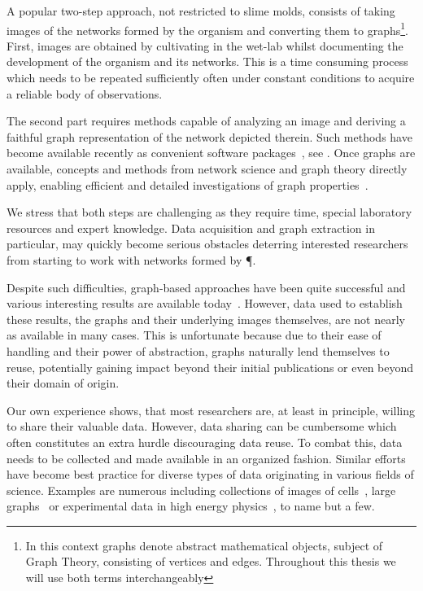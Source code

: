  	A popular two-step approach, not restricted to slime molds, consists of taking images of the networks formed by the organism and converting them to graphs\footnote{In this context graphs denote abstract mathematical objects, subject of Graph Theory, consisting of vertices and edges. Throughout this thesis we will use both terms interchangeably}. First, images are obtained by cultivating \Pp in the wet-lab whilst documenting the development of the organism and its networks. This is a time consuming process which needs to be repeated sufficiently often under constant conditions to acquire a reliable body of observations. 

 	The second part requires methods capable of analyzing an image and deriving a faithful graph representation of the network depicted therein. Such methods have become available recently as convenient software packages~\cite{dirnberger2015nefi}, see . Once graphs are available, concepts and methods from network science and graph theory directly apply, enabling efficient and detailed investigations of graph properties~\cite{baumgarten2012computational,heaton2012analysis}.

 	We stress that both steps are challenging as they require time, special laboratory resources and expert knowledge. Data acquisition and graph extraction in particular, may quickly become serious obstacles deterring interested researchers from starting to work with networks formed by \P. 

 	Despite such difficulties, graph-based approaches have been quite successful and various interesting results are available today~\cite{baumgarten2010plasmodial,baumgarten2013functional,fessel2014analytical,fessel2012Physarum,ito2011characterization}. However, data used to establish these results, \ie the graphs and their underlying images themselves, are not nearly as available in many cases. This is unfortunate because due to their ease of handling and their power of abstraction, graphs naturally lend themselves to reuse, potentially gaining impact beyond their initial publications or even beyond their domain of origin.

 	Our own experience shows, that most researchers are, at least in principle, willing to share their valuable data. However, data sharing can be cumbersome which often constitutes an extra hurdle discouraging data reuse. To combat this, data needs to be collected and made available in an organized fashion. Similar efforts have become best practice for diverse types of data originating in various fields of science. Examples are numerous including collections of images of cells~\cite{cell}, large graphs~\cite{snap} or experimental data in high energy physics~\cite{hepdata}, to name but a few.


